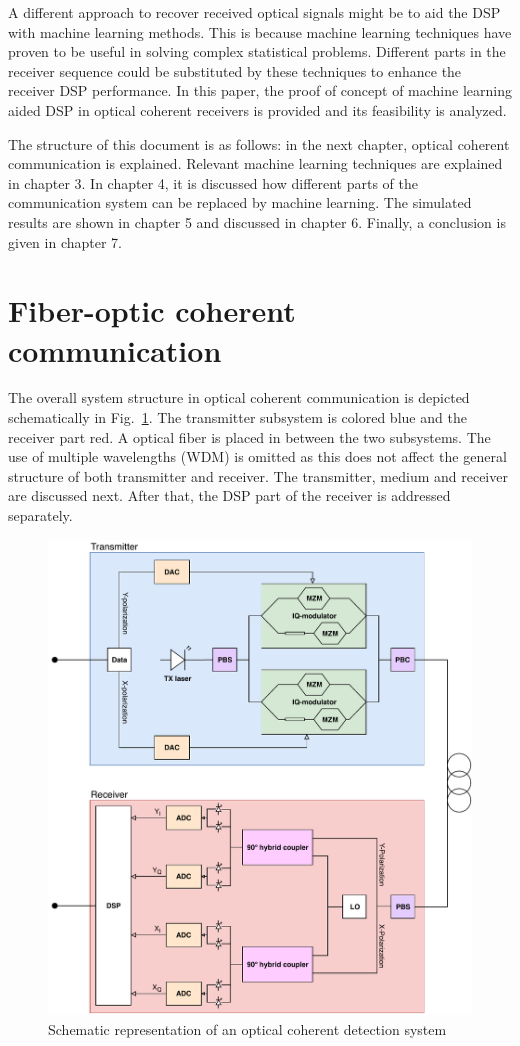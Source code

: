 \documentclass[journal,10pt,twoside, a4paper]{IEEEtran}
\begin{document}
A different approach to recover received optical signals might be to aid the DSP with machine learning methods. This is because machine learning techniques have proven to be useful in solving complex statistical problems. Different parts in the receiver sequence could be substituted by these techniques to enhance the receiver DSP performance. In this paper, the proof of concept of machine learning aided DSP in optical coherent receivers is provided and its feasibility is analyzed.

The structure of this document is as follows: in the next chapter, optical coherent communication is explained. Relevant machine learning techniques are explained in chapter 3. In chapter 4, it is discussed how different parts of the communication system can be replaced by machine learning. The simulated results are shown in chapter 5 and discussed in chapter 6. Finally, a conclusion is given in chapter 7.

\section{Fiber-optic coherent communication}
The overall system structure in optical coherent communication is depicted schematically in Fig.~\ref{fig:coherent_detection}. The transmitter subsystem is colored blue and the receiver part red. A optical fiber is placed in between the two subsystems. The use of multiple wavelengths (WDM) is omitted as this does not affect the general structure of both transmitter and receiver. The transmitter, medium and receiver are discussed next. After that, the DSP part of the receiver is addressed separately.
\begin{figure}
    \centering
    \includegraphics[width=\linewidth]{images/coherent_detection}
    \caption{Schematic representation of an optical coherent detection system}
    \label{fig:coherent_detection}
\end{figure}
\end{document}

